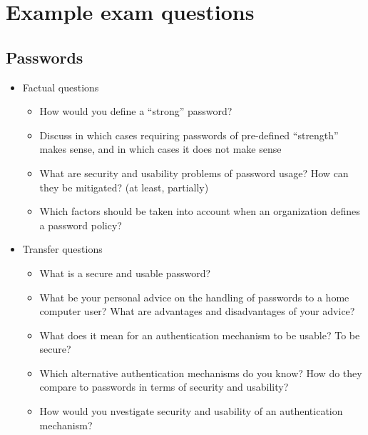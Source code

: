\section{Example exam questions}
\subsection{Passwords}
\begin{itemize}
	\item
		Factual questions
		\begin{itemize}
			\item
				How would you define a \enquote{strong} password?
			\item
				Discuss in which cases requiring passwords of pre-defined \enquote{strength} makes sense, and in which cases it does not make sense
			\item
				What are security and usability problems of password usage? How can they be mitigated? (at least, partially)
			\item
				Which factors should be taken into account when an organization defines a password policy?
		\end{itemize}
	\item
		Transfer questions
		\begin{itemize}
			\item
				What is a secure and usable password?
			\item
				What be your personal advice on the handling of passwords to a home computer user? What are advantages and disadvantages of your advice?
			\item
				What does it mean for an authentication mechanism to be usable? To be secure?
			\item
				Which alternative authentication mechanisms do you know? How do they compare to passwords in terms of security and usability?
			\item
				How would you nvestigate security and usability of an authentication mechanism?
		\end{itemize}
\end{itemize}

